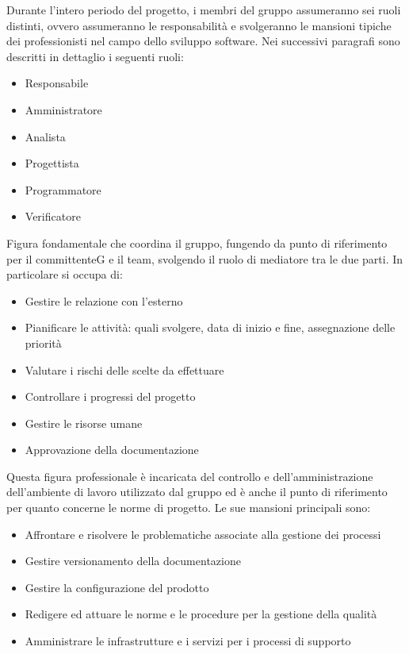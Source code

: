 Durante l’intero periodo del progetto, i membri del gruppo assumeranno sei ruoli distinti, ovvero assumeranno le responsabilità e svolgeranno le mansioni tipiche dei professionisti nel campo dello sviluppo software.
Nei successivi paragrafi sono descritti in dettaglio i seguenti ruoli:
\begin{itemize}
    \item Responsabile
    \item Amministratore
    \item Analista
    \item Progettista
    \item Programmatore
    \item Verificatore
\end{itemize}
Figura fondamentale che coordina il gruppo, fungendo da punto di riferimento per il committenteG e il team, svolgendo il ruolo di mediatore tra le due parti.
In particolare si occupa di:
\begin{itemize}
    \item Gestire le relazione con l'esterno
    \item Pianificare le attività: quali svolgere, data di inizio e fine, assegnazione delle priorità
    \item Valutare i rischi delle scelte da effettuare
    \item Controllare i progressi del progetto
    \item Gestire le risorse umane
    \item Approvazione della documentazione
\end{itemize}
Questa figura professionale è incaricata del controllo e dell’amministrazione dell’ambiente di lavoro utilizzato dal gruppo ed è anche il punto di riferimento per quanto concerne le norme di progetto. Le sue mansioni principali sono:
\begin{itemize}
    \item Affrontare e risolvere le problematiche associate alla gestione dei processi
    \item Gestire versionamento della documentazione 
    \item Gestire la configurazione del prodotto
    \item Redigere ed attuare le norme e le procedure per la gestione della qualità
    \item Amministrare le infrastrutture e i servizi per i processi di supporto
\end{itemize}
